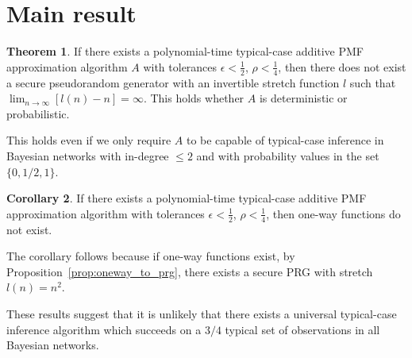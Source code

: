 \documentclass{article}
\theoremstyle{definition}
\newtheorem{defn}{Definition}
\newtheorem{thm}{Theorem}
\newtheorem{cor}[thm]{Corollary}
\theoremstyle{remark}
\begin{document}
\section{Main result} \label{sec:main}

\begin{thm} \label{thm:main}
If there exists a polynomial-time typical-case additive PMF approximation algorithm $A$ with tolerances $\epsilon < \frac{1}{2}$, $\rho < \frac{1}{4}$,
then there does not exist a secure pseudorandom generator with an invertible stretch function $l$ such that $\lim_{n \to \infty}[l(n) - n] = \infty$.
This holds whether $A$ is deterministic or probabilistic.

\smallskip \noindent This holds even if we only require $A$ to be capable of typical-case inference in Bayesian networks with in-degree $\leq 2$ and with probability values in the set $\{0, 1/2, 1\}$.
\end{thm}

\begin{cor} \label{cor:oneway}
If there exists a polynomial-time typical-case additive PMF approximation algorithm with tolerances $\epsilon < \frac{1}{2}$, $\rho < \frac{1}{4}$,
then one-way functions do not exist.
\end{cor}
\noindent The corollary follows because if one-way functions exist, by Proposition~\ref{prop:oneway_to_prg}, there exists a secure PRG with stretch $l(n) = n^2$.


\smallskip
\noindent These results suggest that it is unlikely that there exists a universal typical-case inference algorithm which succeeds on a $3/4$ typical set of observations in all Bayesian networks.
\end{document}
